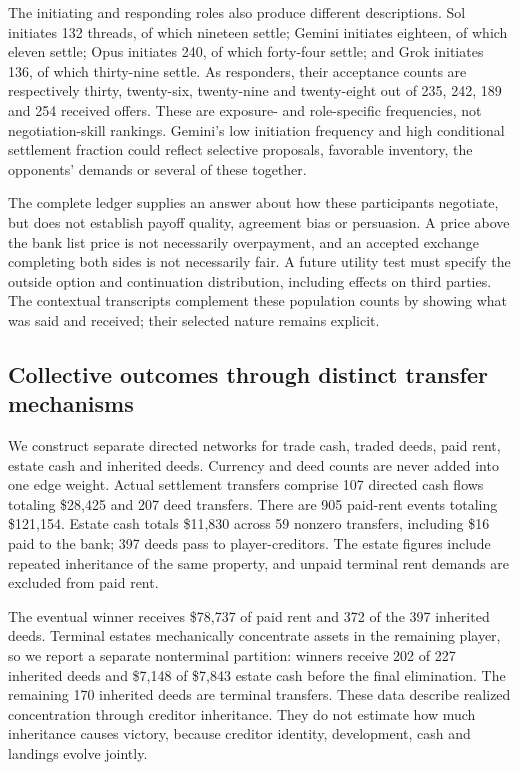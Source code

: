 The initiating and responding roles also produce different descriptions.
Sol initiates 132 threads, of which nineteen settle; Gemini initiates eighteen,
of which eleven settle; Opus initiates 240, of which forty-four settle; and
Grok initiates 136, of which thirty-nine settle. As responders, their acceptance
counts are respectively thirty, twenty-six, twenty-nine and twenty-eight out
of 235, 242, 189 and 254 received offers. These are exposure- and role-specific
frequencies, not negotiation-skill rankings. Gemini's low initiation frequency
and high conditional settlement fraction could reflect selective proposals,
favorable inventory, the opponents' demands or several of these together.

The complete ledger supplies an answer about how these participants negotiate,
but does not establish payoff quality, agreement bias or persuasion. A price
above the bank list price is not necessarily overpayment, and an accepted
exchange completing both sides is not necessarily fair. A future utility test
must specify the outside option and continuation distribution, including effects
on third parties. The contextual transcripts complement these population counts
by showing what was said and received; their selected nature remains explicit.

\subsection{Collective outcomes through distinct transfer mechanisms}
\label{sec:agenda-collective-flows}

We construct separate directed networks for trade cash, traded deeds, paid
rent, estate cash and inherited deeds. Currency and deed counts are never
added into one edge weight. Actual settlement transfers comprise 107 directed
cash flows totaling \$28,425 and 207 deed transfers. There are 905 paid-rent
events totaling \$121,154. Estate cash totals \$11,830 across 59 nonzero
transfers, including \$16 paid to the bank; 397 deeds pass to player-creditors.
The estate figures include repeated inheritance of the same property, and
unpaid terminal rent demands are excluded from paid rent.

The eventual winner receives \$78,737 of paid rent and 372 of the 397 inherited
deeds. Terminal estates mechanically concentrate assets in the remaining
player, so we report a separate nonterminal partition: winners receive 202 of
227 inherited deeds and \$7,148 of \$7,843 estate cash before the final
elimination. The remaining 170 inherited deeds are terminal transfers. These
data describe realized concentration through creditor inheritance. They do not
estimate how much inheritance causes victory, because creditor identity,
development, cash and landings evolve jointly.

